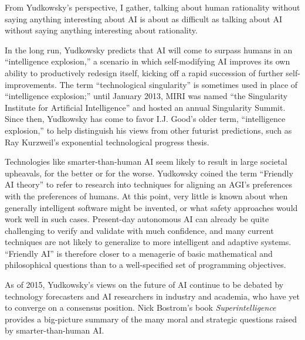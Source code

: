 {
 From Yudkowsky's perspective, I gather, talking
about human rationality without saying anything interesting about AI is
about as difficult as talking about AI without saying anything
interesting about rationality.}

{
 In the long run, Yudkowsky predicts that AI will come to surpass
humans in an ``intelligence
explosion,'' a scenario in which self-modifying AI
improves its own ability to productively redesign itself, kicking off a
rapid succession of further self-improvements. The term
``technological singularity'' is
sometimes used in place of ``intelligence
explosion;'' until January 2013, MIRI was named
``the Singularity Institute for Artificial
Intelligence'' and hosted an annual Singularity
Summit. Since then, Yudkowsky has come to favor I.J.
Good's older term, ``intelligence
explosion,'' to help distinguish his views from other
futurist predictions, such as Ray Kurzweil's
exponential technological progress thesis.}

{
 Technologies like smarter-than-human AI seem likely to result in
large societal upheavals, for the better or for the worse. Yudkowsky
coined the term ``Friendly AI
theory'' to refer to research into techniques for
aligning an AGI's preferences with the preferences of
humans. At this point, very little is known about when generally
intelligent software might be invented, or what safety approaches would
work well in such cases. Present-day autonomous AI can already be quite
challenging to verify and validate with much confidence, and many
current techniques are not likely to generalize to more intelligent and
adaptive systems. ``Friendly AI'' is
therefore closer to a menagerie of basic mathematical and philosophical
questions than to a well-specified set of programming objectives.}

{
 As of 2015, Yudkowsky's views on the future of AI
continue to be debated by technology forecasters and AI researchers in
industry and academia, who have yet to converge on a consensus
position. Nick Bostrom's book
\textit{Superintelligence} provides a big-picture summary of the many
moral and strategic questions raised by smarter-than-human
AI.}

